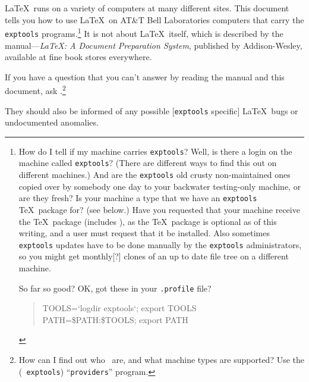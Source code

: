 \LaTeX\ runs on a variety of computers at many different sites.  This
document tells you how to use \LaTeX\ on AT\&T Bell Laboratories
computers that carry the {\tt exptools} programs.\footnote{ How do I
tell if my machine carries {\tt exptools}?  Well, is there a login on
the machine called {\tt exptools}?  (There are different ways to find
this out on different machines.)
And are the {\tt exptools} old crusty non-maintained ones copied over
by somebody one day to your backwater testing-only machine, or are
they fresh?  Is your machine a type that we have an {\tt exptools}
\TeX\ package for? (see below.)  Have you requested that your machine
receive the \TeX\ package (includes \LittleLaTeX), as the \TeX\
package is optional as of this writing, and a user must request that
it be installed.  Also sometimes {\tt exptools} updates have to be
done manually by the {\tt exptools} administrators, so you might get
monthly[?] clones of an up to date file tree on a different machine.


So far so good?  OK, got these in your {\tt .profile} file?

\begin{quote}
\begin{tt}
TOOLS=`logdir exptools`; export TOOLS\\
PATH=\$PATH:\$TOOLS; export PATH
\end{tt}
\end{quote}
}
It is not about \LaTeX\ itself, which is described by
the manual---{\em \LaTeX: A Document Preparation System}, published by
Addison-Wesley, available at fine book stores everywhere.

If you have a question that you can't answer by reading the manual and
this document, ask \contact.\footnote{ How can I find out who
\contact\ are, and what machine types are supported?  Use the ({\tt
exptools}) ``{\tt providers}'' program.
}


They should also be informed of any possible [{\tt exptools} specific]
\LaTeX\ bugs or undocumented anomalies.


